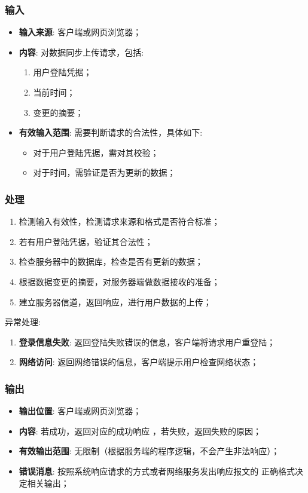 \begin{enumerate}
\subsubsection{输入}
	\begin{itemize}
		\item \textbf{输入来源}: 客户端或网页浏览器；
		\item \textbf{内容}: 对数据同步上传请求，包括: 
		\begin{enumerate}
			\item 用户登陆凭据；
			\item 当前时间；
			\item 变更的摘要；
		\end{enumerate}
		\item \textbf{有效输入范围}: 需要判断请求的合法性，具体如下: 
		\begin{itemize}
			\item 对于用户登陆凭据，需对其校验； 
			\item 对于时间，需验证是否为更新的数据； 
		\end{itemize}
	\end{itemize}
\subsubsection{处理}
	\begin{enumerate}
		\item 检测输入有效性，检测请求来源和格式是否符合标准；
		\item 若有用户登陆凭据，验证其合法性；
		\item 检查服务器中的数据库，检查是否有更新的数据；
		\item 根据数据变更的摘要，对服务器端做数据接收的准备；
		\item 建立服务器信道，返回响应，进行用户数据的上传；
	\end{enumerate}
	\noindent 异常处理: 
	\begin{enumerate}
		\item \textbf{登录信息失败}: 返回登陆失败错误的信息，客户端将请求用户重登陆；
		\item \textbf{网络访问}: 返回网络错误的信息，客户端提示用户检查网络状态；
	\end{enumerate}
\subsubsection{输出}
\begin{itemize}
	\item \textbf{输出位置}: 客户端或网页浏览器；
	\item \textbf{内容}: 若成功，返回对应的成功响应 ，若失败，返回失败的原因；
	\item \textbf{有效输出范围}: 无限制（根据服务端的程序逻辑，不会产生非法响应）；
	\item \textbf{错误消息}: 按照系统响应请求的方式或者网络服务发出响应报文的
		正确格式决定相关输出；
\end{itemize}


\end{enumerate}
